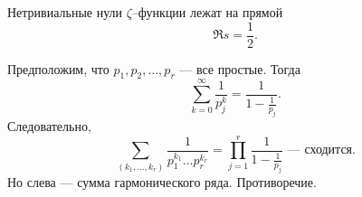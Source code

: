 \begin{hypothesis}[Римана]
    Нетривиальные нули $\zeta$--функции лежат на прямой
    \[
        \Re{s} = \frac{1}{2}.
    \]
\end{hypothesis}

\begin{remark}
    Предположим, что $p_1, p_2, \dots, p_r$ --- все простые. Тогда
    \[
       \sum_{k=0}^\infty \frac{1}{p_j^k} = \frac{1}{1-\frac{1}{p_j}}.
    \]
    Следовательно,
    \[
        \sum_{(k_1,\dots,k_r)} \frac{1}{p_1^{k_1} \dots p_r^{k_r}} = 
        \prod_{j=1}^r \frac{1}{1-\frac{1}{p_j}} \text{ --- сходится}.
    \]
    Но слева --- сумма гармонического ряда. Противоречие.
\end{remark}
